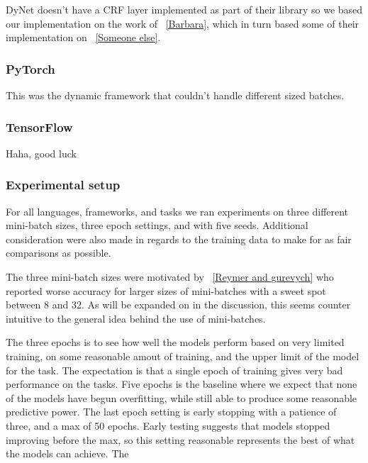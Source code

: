 DyNet doesn't have a CRF layer implemented as part of their library so we based
our implementation on the work of ~\ref{Barbara}, which in turn based some of
their implementation on ~\ref{Someone else}. 


\subsubsection*{PyTorch}

This was the dynamic framework that couldn't handle different sized batches.


\subsubsection*{TensorFlow}

Haha, good luck



\subsubsection{Experimental setup}

For all languages, frameworks, and tasks we ran experiments on three different
mini-batch sizes, three epoch settings, and with five seeds. Additional
consideration were also made in regards to the training data to make for as fair
comparisons as possible.

The three mini-batch sizes were motivated by ~\ref{Reymer and gurevych} who
reported worse accuracy for larger sizes of mini-batches with a sweet spot
between 8 and 32. As will be expanded on in the discussion, this seems counter
intuitive to the general idea behind the use of mini-batches. %

The three epochs is to see how well the models perform based on very limited
training, on some reasonable amout of training, and the upper limit of the model
for the task. The expectation is that a single epoch of training gives very bad
performance on the tasks. Five epochs is the baseline where we expect that none
of the models have begun overfitting, while still able to produce some
reasonable predictive power. The last epoch setting is early stopping with a
patience of three, and a max of 50 epochs. Early testing suggests that models
stopped improving before the max, so this setting reasonable represents the best
of what the models can achieve. The 


